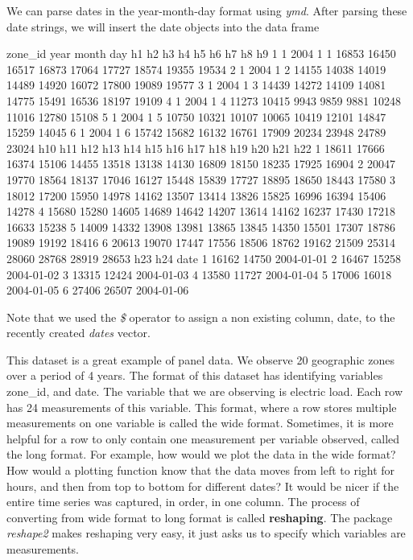 \documentclass{article}
\begin{document}
We can parse dates in the year-month-day format using \textit{ymd}.  After parsing
these date strings, we will insert the date objects into the data frame

\begin{Schunk}
\begin{Soutput}
  zone_id year month day    h1    h2    h3    h4    h5    h6    h7    h8    h9
1       1 2004     1   1 16853 16450 16517 16873 17064 17727 18574 19355 19534
2       1 2004     1   2 14155 14038 14019 14489 14920 16072 17800 19089 19577
3       1 2004     1   3 14439 14272 14109 14081 14775 15491 16536 18197 19109
4       1 2004     1   4 11273 10415  9943  9859  9881 10248 11016 12780 15108
5       1 2004     1   5 10750 10321 10107 10065 10419 12101 14847 15259 14045
6       1 2004     1   6 15742 15682 16132 16761 17909 20234 23948 24789 23024
    h10   h11   h12   h13   h14   h15   h16   h17   h18   h19   h20   h21   h22
1 18611 17666 16374 15106 14455 13518 13138 14130 16809 18150 18235 17925 16904
2 20047 19770 18564 18137 17046 16127 15448 15839 17727 18895 18650 18443 17580
3 18012 17200 15950 14978 14162 13507 13414 13826 15825 16996 16394 15406 14278
4 15680 15280 14605 14689 14642 14207 13614 14162 16237 17430 17218 16633 15238
5 14009 14332 13908 13981 13865 13845 14350 15501 17307 18786 19089 19192 18416
6 20613 19070 17447 17556 18506 18762 19162 21509 25314 28060 28768 28919 28653
    h23   h24       date
1 16162 14750 2004-01-01
2 16467 15258 2004-01-02
3 13315 12424 2004-01-03
4 13580 11727 2004-01-04
5 17006 16018 2004-01-05
6 27406 26507 2004-01-06
\end{Soutput}
\end{Schunk}

Note that we used the \textit{\$} operator to assign a non existing column, date,
to the recently created \textit{dates} vector.

This dataset is a great example of panel data.  We observe 20 geographic zones
over a period of 4 years.  The format of this dataset has identifying variables
zone\_id, and date.  The variable that we are observing is electric load.
Each row has 24 measurements of this variable.  This format, where a row stores
multiple measurements on one variable is called the wide format.  Sometimes,
it is more helpful for a row to only contain one measurement per variable observed,
called the long format.  For example, how would we plot the data in the wide format?
How would a plotting function know that the data moves from left to right for hours,
and then from top to bottom for different dates?  It would be nicer if the
entire time series was captured, in order, in one column.  The process of
converting from wide format to long format is called \textbf{reshaping}.
The package \textit{reshape2} makes reshaping very easy, it just asks us
to specify which variables are measurements.
\end{document}
